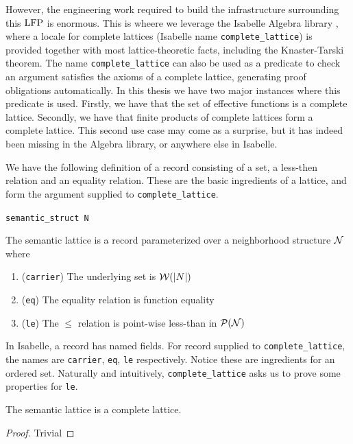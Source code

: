 However, the engineering work required to build the infrastructure surrounding this $\operatorname{LFP}$ is enormous. This is wheere we leverage the Isabelle Algebra library \cite{HOL-Alg}, where a locale for complete lattices (Isabelle name \texttt{complete\_lattice}) is provided together with most lattice-theoretic facts, including the Knaster-Tarski theorem. The name \texttt{complete\_lattice} can also be used as a predicate to check an argument satisfies the axioms of a complete lattice, generating proof obligations automatically. In this thesis we have two major instances where this predicate is used. Firstly, we have that the set of effective functions is a complete lattice. Secondly, we have that finite products of complete lattices form a complete lattice. This second use case may come as a surprise, but it has indeed been missing in the Algebra library, or anywhere else in Isabelle.

We have the following definition of a record consisting of a set, a less-then relation and an equality relation. These are the basic ingredients of a lattice, and form the argument supplied to \texttt{complete\_lattice}.

\begin{bdefinition}
\texttt{semantic\_struct N}
\label{def:sem_lat}

The semantic lattice is a record parameterized over a neighborhood structure $\mathcal N$ where 
\begin{enumerate}
    \item (\texttt{carrier}) The underlying set is $\mathcal W(|N|)$
    \item (\texttt{eq}) The equality relation is function equality
    \item (\texttt{le}) The $\leq$ relation is point-wise less-than in $\mathcal{P} (\mathcal N)$
\end{enumerate}

\end{bdefinition}

In Isabelle, a record has named fields. For record supplied to \texttt{complete\_lattice}, the names are \texttt{carrier}, \texttt{eq}, \texttt{le} respectively. Notice these are ingredients for an ordered set. Naturally and intuitively, \texttt{complete\_lattice} asks us to prove some properties for \texttt{le}.

\begin{blemma}

The semantic lattice is a complete lattice.
\end{blemma}
\begin{proof}
    Trivial
\end{proof}

